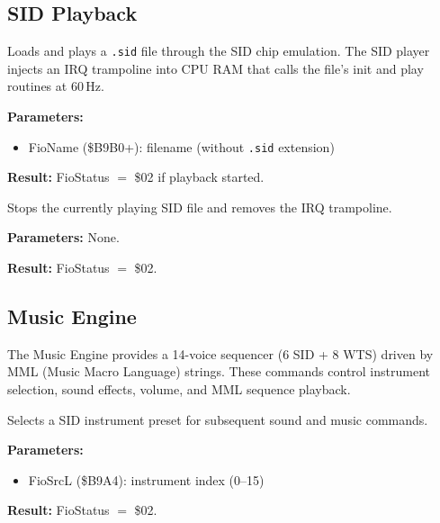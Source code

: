 \subsection{SID Playback}


Loads and plays a \texttt{.sid} file through the SID chip emulation.  The
SID player injects an IRQ trampoline into CPU RAM that calls the file's
init and play routines at 60\,Hz.

\textbf{Parameters:}
\begin{itemize}
  \item FioName (\$B9B0+): filename (without \texttt{.sid} extension)
\end{itemize}

\textbf{Result:} FioStatus $=$ \$02 if playback started.

\medskip


Stops the currently playing SID file and removes the IRQ trampoline.

\textbf{Parameters:} None.

\textbf{Result:} FioStatus $=$ \$02.


\subsection{Music Engine}

The Music Engine provides a 14-voice sequencer (6 SID + 8 WTS) driven by
MML (Music Macro Language) strings.  These commands control instrument
selection, sound effects, volume, and MML sequence playback.


Selects a SID instrument preset for subsequent sound and music commands.

\textbf{Parameters:}
\begin{itemize}
  \item FioSrcL (\$B9A4): instrument index (0--15)
\end{itemize}

\textbf{Result:} FioStatus $=$ \$02.

